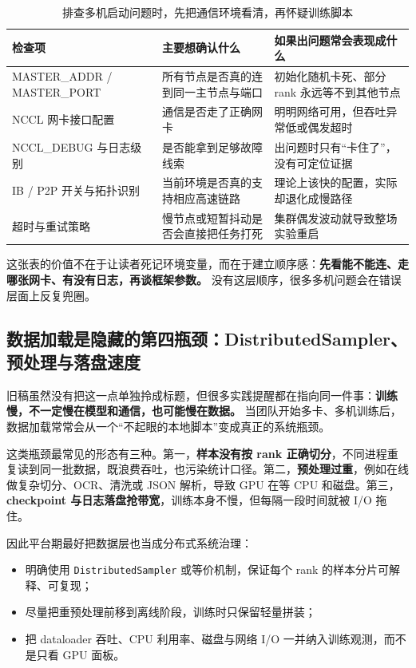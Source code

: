 \begin{table}[H]
\centering
\small
\begin{tabularx}{\textwidth}{>{\raggedright\arraybackslash}p{3cm}>{\raggedright\arraybackslash}p{3.4cm}>{\raggedright\arraybackslash}X}
\toprule
\textbf{检查项} & \textbf{主要想确认什么} & \textbf{如果出问题常会表现成什么} \\
\midrule
MASTER\_ADDR / MASTER\_PORT & 所有节点是否真的连到同一主节点与端口 & 初始化随机卡死、部分 rank 永远等不到其他节点 \\
NCCL 网卡接口配置 & 通信是否走了正确网卡 & 明明网络可用，但吞吐异常低或偶发超时 \\
NCCL\_DEBUG 与日志级别 & 是否能拿到足够故障线索 & 出问题时只有“卡住了”，没有可定位证据 \\
IB / P2P 开关与拓扑识别 & 当前环境是否真的支持相应高速链路 & 理论上该快的配置，实际却退化成慢路径 \\
超时与重试策略 & 慢节点或短暂抖动是否会直接把任务打死 & 集群偶发波动就导致整场实验重启 \\
\bottomrule
\end{tabularx}
\caption{排查多机启动问题时，先把通信环境看清，再怀疑训练脚本}
\label{tab:nccl-checklist}
\end{table}

这张表的价值不在于让读者死记环境变量，而在于建立顺序感：\textbf{先看能不能连、走哪张网卡、有没有日志，再谈框架参数。} 没有这层顺序，很多多机问题会在错误层面上反复兜圈。

\subsection{数据加载是隐藏的第四瓶颈：DistributedSampler、预处理与落盘速度}
旧稿虽然没有把这一点单独拎成标题，但很多实践提醒都在指向同一件事：\textbf{训练慢，不一定慢在模型和通信，也可能慢在数据。} 当团队开始多卡、多机训练后，数据加载常常会从一个“不起眼的本地脚本”变成真正的系统瓶颈。

这类瓶颈最常见的形态有三种。第一，\textbf{样本没有按 rank 正确切分}，不同进程重复读到同一批数据，既浪费吞吐，也污染统计口径。第二，\textbf{预处理过重}，例如在线做复杂切分、OCR、清洗或 JSON 解析，导致 GPU 在等 CPU 和磁盘。第三，\textbf{checkpoint 与日志落盘抢带宽}，训练本身不慢，但每隔一段时间就被 I/O 拖住。

因此平台期最好把数据层也当成分布式系统治理：
\begin{itemize}
  \item 明确使用 \texttt{DistributedSampler} 或等价机制，保证每个 rank 的样本分片可解释、可复现；
  \item 尽量把重预处理前移到离线阶段，训练时只保留轻量拼装；
  \item 把 dataloader 吞吐、CPU 利用率、磁盘与网络 I/O 一并纳入训练观测，而不是只看 GPU 面板。
\end{itemize}

